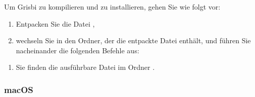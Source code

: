 Um Grisbi zu kompilieren und zu installieren, gehen Sie wie folgt vor:

\begin{enumerate}
	\item Entpacken Sie die Datei ,
	\item wechseln Sie in den Ordner, der die entpackte Datei enthält, und führen Sie nacheinander die folgenden Befehle aus:
\end{enumerate}

\setlength{\parindent}{20pt}
\par
\par
\vspace{1mm}

\begin{enumerate}[resume]
	\item Sie finden die ausführbare Datei im Ordner .
\end{enumerate}


\subsubsection{macOS\label{start-install-stable-macos}}

